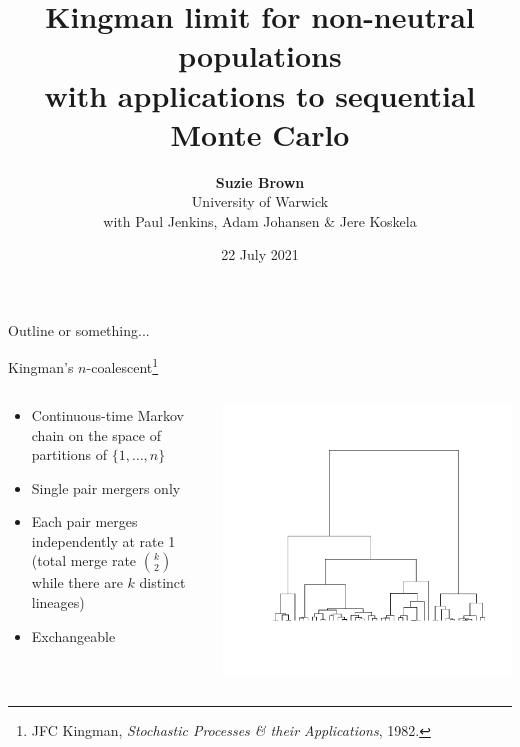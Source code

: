 \documentclass[aspectratio=169]{beamer}
\title[Non-neutral populations]{Kingman limit for non-neutral populations\\ with applications to sequential Monte Carlo}
\author[Suzie Brown]{\textbf{Suzie Brown} \\[5pt] University of Warwick \\ with Paul Jenkins, Adam Johansen \& Jere Koskela}
\date{22 July 2021}
\theoremstyle{definition}
\begin{document}
\begin{frame}
\maketitle
\end{frame}


\begin{frame}{Outline or something...}
\end{frame}


\begin{frame}{Kingman's $n$-coalescent\footnote[frame]{JFC Kingman, \textit{Stochastic Processes \& their Applications}, 1982.}}
\begin{columns}
\begin{column}{0.45\textwidth}
\begin{itemize}
\item Continuous-time Markov chain on the space of partitions of $\{1,\dots,n\}$
\item Single pair mergers only
\item Each pair merges independently at rate 1 (total merge rate $\binom{k}{2}$ while there are $k$ distinct lineages)
\item Exchangeable
\end{itemize}
\end{column}
\begin{column}{0.45\textwidth}
\includegraphics[width=\textwidth, trim={2.8cm 3cm 1.5cm 2cm}, clip]{ncoalescent.pdf}
\end{column}
\end{columns}
\end{frame}
\end{document}

